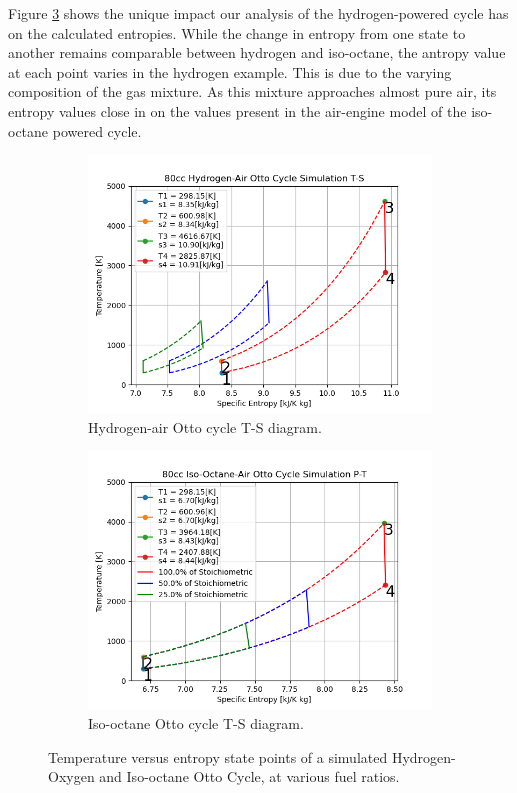 \documentclass[conf]{new-aiaa}
\begin{document}
Figure \ref{fig:ts_diag} shows the unique impact our analysis of the hydrogen-powered cycle has on the calculated entropies. While the change in entropy from one state to another remains comparable between hydrogen and iso-octane, the antropy value at each point varies in the hydrogen example. This is due to the varying composition of the gas mixture. As this mixture approaches almost pure air, its entropy values close in on the values present in the air-engine model of the iso-octane powered cycle.

\begin{figure}[H]
\centering
\begin{subfigure}{0.5\linewidth}
  \centering
  \includegraphics[width=1\linewidth]{Figures/Hydrogen/T-S.png}
  \caption{Hydrogen-air Otto cycle T-S diagram.}
  \label{fig:t-s_diag_h2}
\end{subfigure}%
\begin{subfigure}{0.5\linewidth}
  \centering
  \includegraphics[width=1\linewidth]{Figures/Iso-octane/T-S.png}
  \caption{Iso-octane Otto cycle T-S diagram.}
  \label{fig:t-s_diag_iso}
\end{subfigure}
\caption{Temperature versus entropy state points of a simulated Hydrogen-Oxygen and Iso-octane Otto Cycle, at various fuel ratios.}
\label{fig:ts_diag}
\end{figure}
\end{document}
